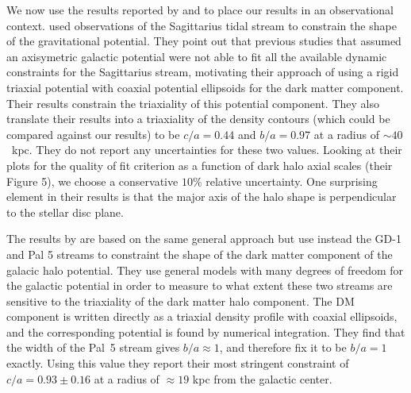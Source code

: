 \documentclass[usenatbib]{mnras}
\begin{document}

We now use the results reported by \cite{LM10} and \cite{Bovy16}
to place our results in an observational context.
\cite{LM10} used observations of the Sagittarius tidal stream to
constrain the shape of the gravitational potential.
They point out that previous studies that assumed an
axisymetric galactic potential were not able to fit all the available
dynamic constraints for the Sagittarius stream, motivating 
their approach of using a rigid triaxial potential with coaxial potential
ellipsoids for the dark matter component.  
Their results constrain the triaxiality of this potential
component.  They also translate their results into a triaxiality of the density
contours (which could be compared against our results)
 to be $c/a=0.44$ and $b/a=0.97$ at a radius of $\sim 40$~kpc. 
They do not report any uncertainties for these two values. 
Looking at their plots for the quality of fit criterion as a function
of dark halo axial scales (their Figure 5), we choose a conservative $10\%$
relative uncertainty. One surprising element in their results is that 
the major axis of the
halo shape is perpendicular to the stellar disc plane.  

The results by \cite{Bovy16} are based on the same general approach but use
instead the GD-1 \citep{2006ApJ...641L..37G} and Pal 5 \citep{2009AJ....137.3378O}
streams to constraint the shape of the dark matter component of the
galacic halo potential. They use general models with many degrees of freedom for the galactic
potential in order to measure to what extent these two streams are sensitive
to the triaxiality of the dark matter halo component.
The DM component is written directly as a triaxial density profile
with coaxial ellipsoids, and the corresponding potential is found by
numerical integration. They find that the width of the Pal~5 stream gives $b/a\approx
1$, and therefore fix it to be $b/a=1$ exactly. Using this value they report their 
most stringent constraint of $c/a=0.93\pm0.16$ at a radius of $\approx 19$ kpc from the galactic
center. 
\end{document}
